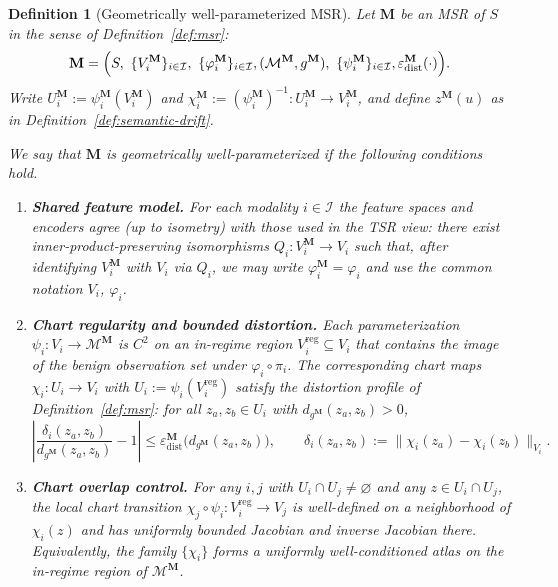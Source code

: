 \documentclass[11pt]{article}
\newtheorem{definition}{Definition}
\begin{document}
\begin{definition}[Geometrically well-parameterized MSR]
\label{def:geom-well-param}
Let $\mathbf{M}$ be an MSR of $S$ in the sense of
Definition~\ref{def:msr}:
\[
\mathbf{M}
=
\Bigl(
S,\ \{V_i^{\mathbf{M}}\}_{i\in\mathcal{I}},\ \{\varphi_i^{\mathbf{M}}\}_{i\in\mathcal{I}},
(\mathcal{M}^{\mathbf{M}}, g^{\mathbf{M}}),\ \{\psi_i^{\mathbf{M}}\}_{i\in\mathcal{I}},
\varepsilon_{\mathrm{dist}}^{\mathbf{M}}(\cdot)
\Bigr).
\]
Write $U_i^{\mathbf{M}} := \psi_i^{\mathbf{M}}(V_i^{\mathbf{M}})$ and
$\chi_i^{\mathbf{M}} := (\psi_i^{\mathbf{M}})^{-1} : U_i^{\mathbf{M}} \to V_i^{\mathbf{M}}$,
and define $z^{\mathbf{M}}(u)$ as in Definition~\ref{def:semantic-drift}.

We say that $\mathbf{M}$ is \emph{geometrically well-parameterized} if the
following conditions hold.

\begin{enumerate}[label=(\roman*),leftmargin=*]

\item \textbf{Shared feature model.}
For each modality $i\in\mathcal{I}$ the feature spaces and encoders agree
(up to isometry) with those used in the TSR view:
there exist inner-product-preserving isomorphisms
$Q_i : V_i^{\mathbf{M}} \to V_i$ such that, after identifying
$V_i^{\mathbf{M}}$ with $V_i$ via $Q_i$, we may write
$\varphi_i^{\mathbf{M}} = \varphi_i$ and use the common notation
$V_i$, $\varphi_i$.

\item \textbf{Chart regularity and bounded distortion.}
Each parameterization $\psi_i : V_i \to \mathcal{M}^{\mathbf{M}}$ is $C^2$
on an in-regime region $V_i^{\mathrm{reg}} \subseteq V_i$ that contains the
image of the benign observation set under $\varphi_i \circ \pi_i$.
The corresponding chart maps
$\chi_i : U_i \to V_i$ with $U_i := \psi_i(V_i^{\mathrm{reg}})$ satisfy the
distortion profile of Definition~\ref{def:msr}: for all
$z_a,z_b \in U_i$ with $d_{g^{\mathbf{M}}}(z_a,z_b) > 0$,
\begin{equation}
\label{eq:chart-distortion}
\left|
\frac{\delta_i(z_a,z_b)}{d_{g^{\mathbf{M}}}(z_a,z_b)} - 1
\right|
\le
\varepsilon_{\mathrm{dist}}^{\mathbf{M}}\bigl(d_{g^{\mathbf{M}}}(z_a,z_b)\bigr),
\qquad
\delta_i(z_a,z_b) := \bigl\|\chi_i(z_a) - \chi_i(z_b)\bigr\|_{V_i}.
\end{equation}

\item \textbf{Chart overlap control.}
For any $i,j$ with $U_i \cap U_j \neq \varnothing$ and any
$z \in U_i \cap U_j$,
the local chart transition
$\chi_j \circ \psi_i : V_i^{\mathrm{reg}} \to V_j$
is well-defined on a neighborhood of $\chi_i(z)$ and has uniformly bounded
Jacobian and inverse Jacobian there. Equivalently, the family
$\{\chi_i\}$ forms a uniformly well-conditioned atlas on the in-regime
region of $\mathcal{M}^{\mathbf{M}}$.


\end{enumerate}
\end{definition}
\end{document}
